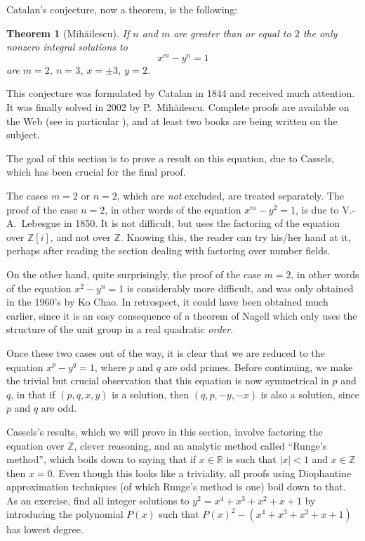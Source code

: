 \documentclass[12pt,a4paper]{article}
\newcommand{\Z}{{\mathbb Z}}
\newcommand{\R}{{\mathbb R}}
\newtheorem{theorem}{Theorem}[section]
\begin{document}
Catalan's conjecture, now a theorem, is the following:

\begin{theorem}[Mih\u{a}ilescu]\label{mihathm} If $n$ and $m$ are greater than
or equal to $2$ the only nonzero integral solutions to $$x^m-y^n=1$$
are $m=2$, $n=3$, $x=\pm3$, $y=2$.\end{theorem}

This conjecture was formulated by Catalan in 1844 and received much attention.
It was finally solved in 2002 by P.~Mih\u{a}ilescu. Complete proofs are 
available on the Web (see in particular \cite{Mis}), and at least 
two books are being written on the subject.

The goal of this section is to prove a result on this equation, due to Cassels,
which has been crucial for the final proof.

The cases $m=2$ or $n=2$, which are \emph{not} excluded, are treated
separately. The proof of the case $n=2$, in other words of the equation 
$x^m-y^2=1$, is due to V.-A.~Lebesgue in 1850. It is not difficult, but
uses the factoring of the equation over $\Z[i]$, and not over $\Z$. Knowing 
this, the reader can try his/her hand at it, perhaps after reading the
section dealing with factoring over number fields.

On the other hand, quite surprisingly, the proof of the case $m=2$, in other
words of the equation $x^2-y^n=1$ is considerably more difficult, and was
only obtained in the 1960's by Ko Chao. In retrospect, it could have been
obtained much earlier, since it is an easy consequence of a theorem of Nagell
which only uses the structure of the unit group in a real quadratic 
\emph{order}.

Once these two cases out of the way, it is clear that we are reduced to
the equation $x^p-y^q=1$, where $p$ and $q$ are odd primes. Before continuing,
we make the trivial but crucial observation that this equation is now
symmetrical in $p$ and $q$, in that if $(p,q,x,y)$ is a solution, then
$(q,p,-y,-x)$ is also a solution, since $p$ and $q$ are odd.

\smallskip

Cassels's results, which we will prove in this section, involve factoring
the equation over $\Z$, clever reasoning, and an analytic method called
``Runge's method'', which boils down to saying that if $x\in\R$ is such that
$|x|<1$ and $x\in\Z$ then $x=0$. Even though this looks like a triviality,
all proofs using Diophantine approximation techniques (of which Runge's method
is one) boil down to that. As an exercise, find all integer solutions to
$y^2=x^4+x^3+x^2+x+1$ by introducing the polynomial $P(x)$ such that
$P(x)^2-(x^4+x^3+x^2+x+1)$ has lowest degree.
\end{document}
